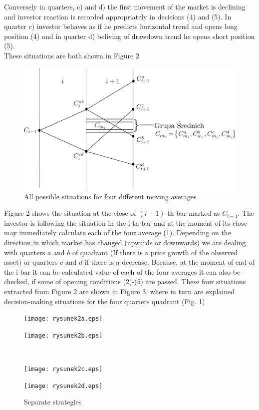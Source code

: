 Conversely in quarters, c) and d) the first movement of the market is declining and investor reaction is recorded appropriately in decisions (4) and (5). In quarter c) investor behaves as if he predicts horizontal trend and opens long position (4) and in quarter d) beliving of drawdown trend he opens short position (5). \\
These situations are both shown in Figure 2\\
\begin{figure}[h]
\centering
\centering 
\includegraphics[width=\textwidth]{rysunek1pp.eps}
\caption{All possible situations for four different moving averages}
\end{figure}
\FloatBarrier
\indent Figure 2 shows the situation at the close of $(i-1)$-th bar marked as $C_{i-1}$. The investor is following the situation in the i-th bar and at the moment of its close may immediately calculate each of the four average (1). Depending on the direction in which market has changed (upwards or downwards) we are dealing with quarters $a$ and $b$ of quadrant (If there is a price growth of the observed asset) or quarters $c$ and $d$ if there is a decrease.
Because, at the moment of end of the i bar it can be calculated  value of each of the four averages it can also be checked, if some of opening conditions (2)-(5) are passed. These four situations extracted from Figure 2 are shown in Figure 3, where in turn are explained  decision-making situations for the four quarters quadrant (Fig. 1)\\
\begin{figure}[h]
\centering
\begin{minipage}{.49\linewidth}
\centering \texttt{[image: rysunek2a.eps]}
\label{jedno}
\end{minipage}
\begin{minipage}{.49\linewidth}
\centering \texttt{[image: rysunek2b.eps]}
\label{dwu}
\end{minipage}
\\
\begin{minipage}{.49\linewidth}
\centering \texttt{[image: rysunek2c.eps]}
\label{cztero}
\end{minipage}
\begin{minipage}{.49\linewidth}
\centering 
\texttt{[image: rysunek2d.eps]}
\label{mansard}
\end{minipage}
\caption{Separate strategies}
\end{figure}
